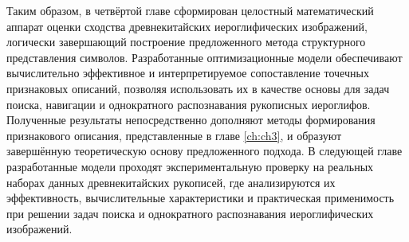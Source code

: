Таким образом, в четвёртой главе сформирован целостный математический аппарат оценки сходства древнекитайских иероглифических изображений, логически завершающий построение предложенного метода структурного представления символов. Разработанные оптимизационные модели обеспечивают вычислительно эффективное и интерпретируемое сопоставление точечных признаковых описаний, позволяя использовать их в качестве основы для задач поиска, навигации и однократного распознавания рукописных иероглифов. Полученные результаты непосредственно дополняют методы формирования признакового описания, представленные в главе \cref{ch:ch3}, и образуют завершённую теоретическую основу предложенного подхода. В следующей главе разработанные модели проходят экспериментальную проверку на реальных наборах данных древнекитайских рукописей, где анализируются их эффективность, вычислительные характеристики и практическая применимость при решении задач поиска и однократного распознавания иероглифических изображений.

\clearpage
